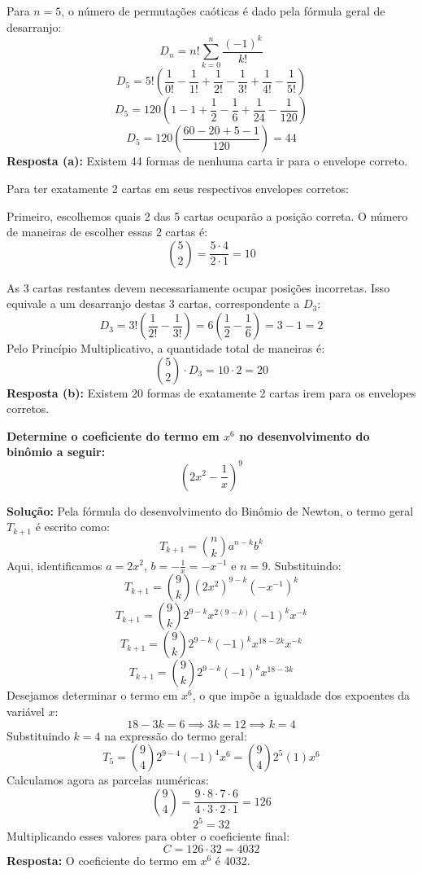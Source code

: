 \documentclass[a4paper,10pt,landscape,twocolumn]{article}  %
\let\oldenumerate\enumerate
\let\oldendenumerate\endenumerate
\renewenvironment{enumerate}{%
  \oldenumerate%
  \setlength{\itemsep}{1pt}%
  \setlength{\parskip}{0pt}%
  \setlength{\parsep}{0pt}%
  \setlength{\topsep}{2pt}%
  \setlength{\partopsep}{0pt}%
}{%
  \oldendenumerate%
}
\let\olditemize\itemize
\let\oldenditemize\enditemize
\renewenvironment{itemize}{%
  \olditemize%
  \setlength{\itemsep}{1pt}%
  \setlength{\parskip}{0pt}%
  \setlength{\parsep}{0pt}%
  \setlength{\topsep}{2pt}%
  \setlength{\partopsep}{0pt}%
}{%
  \oldenditemize%
}
\begin{document}
\begin{enumerate}
\begin{enumerate}
        Para $n=5$, o número de permutações caóticas é dado pela fórmula geral de desarranjo:
        \[ D_n = n! \sum_{k=0}^n \frac{(-1)^k}{k!} \]
        \[ D_5 = 5! \left( \frac{1}{0!} - \frac{1}{1!} + \frac{1}{2!} - \frac{1}{3!} + \frac{1}{4!} - \frac{1}{5!} \right) \]
        \[ D_5 = 120 \left( 1 - 1 + \frac{1}{2} - \frac{1}{6} + \frac{1}{24} - \frac{1}{120} \right) \]
        \[ D_5 = 120 \left( \frac{60 - 20 + 5 - 1}{120} \right) = 44 \]
        \textbf{Resposta (a):} Existem 44 formas de nenhuma carta ir para o envelope correto.
        
        \item Para ter exatamente 2 cartas em seus respectivos envelopes corretos:
        \begin{itemize}
            \item Primeiro, escolhemos quais 2 das 5 cartas ocuparão a posição correta. O número de maneiras de escolher essas 2 cartas é:
            \[ \binom{5}{2} = \frac{5 \cdot 4}{2 \cdot 1} = 10 \]
            \item As 3 cartas restantes devem necessariamente ocupar posições incorretas. Isso equivale a um desarranjo destas 3 cartas, correspondente a $D_3$:
            \[ D_3 = 3! \left( \frac{1}{2!} - \frac{1}{3!} \right) = 6 \left( \frac{1}{2} - \frac{1}{6} \right) = 3 - 1 = 2 \]
        \end{itemize}
        Pelo Princípio Multiplicativo, a quantidade total de maneiras é:
        \[ \binom{5}{2} \cdot D_3 = 10 \cdot 2 = 20 \]
        \textbf{Resposta (b):} Existem 20 formas de exatamente 2 cartas irem para os envelopes corretos.
    \end{enumerate}

    \item \textbf{Determine o coeficiente do termo em $x^6$ no desenvolvimento do binômio a seguir:}
    \[ \left(2x^2 - \frac{1}{x}\right)^9 \]
    
    \textbf{Solução:}
    Pela fórmula do desenvolvimento do Binômio de Newton, o termo geral $T_{k+1}$ é escrito como:
    \[ T_{k+1} = \binom{n}{k} a^{n-k} b^k \]
    Aqui, identificamos $a = 2x^2$, $b = -\frac{1}{x} = -x^{-1}$ e $n = 9$. Substituindo:
    \[ T_{k+1} = \binom{9}{k} (2x^2)^{9-k} (-x^{-1})^k \]
    \[ T_{k+1} = \binom{9}{k} 2^{9-k} x^{2(9-k)} (-1)^k x^{-k} \]
    \[ T_{k+1} = \binom{9}{k} 2^{9-k} (-1)^k x^{18 - 2k} x^{-k} \]
    \[ T_{k+1} = \binom{9}{k} 2^{9-k} (-1)^k x^{18-3k} \]
    Desejamos determinar o termo em $x^6$, o que impõe a igualdade dos expoentes da variável $x$:
    \[ 18 - 3k = 6 \implies 3k = 12 \implies k = 4 \]
    Substituindo $k = 4$ na expressão do termo geral:
    \[ T_5 = \binom{9}{4} 2^{9-4} (-1)^4 x^6 = \binom{9}{4} 2^5 (1) x^6 \]
    Calculamos agora as parcelas numéricas:
    \[ \binom{9}{4} = \frac{9 \cdot 8 \cdot 7 \cdot 6}{4 \cdot 3 \cdot 2 \cdot 1} = 126 \]
    \[ 2^5 = 32 \]
    Multiplicando esses valores para obter o coeficiente final:
    \[ C = 126 \cdot 32 = 4032 \]
    \textbf{Resposta:} O coeficiente do termo em $x^6$ é 4032.


\end{enumerate}
\end{document}
